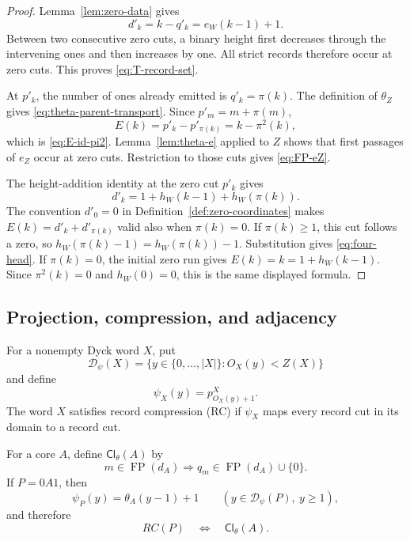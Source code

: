 \documentclass[11pt]{article}
\theoremstyle{definition}
\theoremstyle{remark}
\DeclareMathOperator{\FP}{FP}
\begin{document}
\begin{proof}
Lemma~\ref{lem:zero-data} gives
\[
 d'_k=k-q'_k=e_W(k-1)+1.
\]
Between two consecutive zero cuts, a binary height first decreases through
the intervening ones and then increases by one.  All strict records therefore
occur at zero cuts.  This proves \eqref{eq:T-record-set}.

At \(p'_k\), the number of ones already emitted is \(q'_k=\pi(k)\).  The
definition of \(\theta_Z\) gives \eqref{eq:theta-parent-transport}.  Since
\(p'_m=m+\pi(m)\),
\[
 E(k)=p'_k-p'_{\pi(k)}=k-\pi^2(k),
\]
which is \eqref{eq:E-id-pi2}.  Lemma~\ref{lem:theta-e} applied to \(Z\)
shows that first passages of \(e_Z\) occur at zero cuts.  Restriction to those
cuts gives \eqref{eq:FP-eZ}.

The height-addition identity at the zero cut \(p'_k\) gives
\[
 d'_k=1+h_W(k-1)+h_W(\pi(k)).
\]
The convention \(d'_0=0\) in
Definition~\ref{def:zero-coordinates} makes
\(E(k)=d'_k+d'_{\pi(k)}\) valid also when \(\pi(k)=0\).  If
\(\pi(k)\geq1\), this cut follows a zero,
so \(h_W(\pi(k)-1)=h_W(\pi(k))-1\).  Substitution gives
\eqref{eq:four-head}.  If \(\pi(k)=0\), the initial zero run gives
\(E(k)=k=1+h_W(k-1)\).  Since \(\pi^2(k)=0\) and \(h_W(0)=0\), this is the
same displayed formula.
\end{proof}

\subsection{Projection, compression, and adjacency}

For a nonempty Dyck word \(X\), put
\[
 \mathcal D_\psi(X)=\{y\in\{0,\ldots,|X|\}:O_X(y)<Z(X)\}
\]
and define
\begin{equation}
\label{eq:compression-map}
 \psi_X(y)=p^X_{O_X(y)+1}.
\end{equation}
The word \(X\) satisfies record compression (RC) if \(\psi_X\) maps every record cut in its domain
to a record cut.

For a core \(A\), define \(\mathsf{Cl}_\theta(A)\) by
\begin{equation}
\label{eq:theta-closure}
 m\in\FP(d_A)\Longrightarrow q_m\in\FP(d_A)\cup\{0\}.
\end{equation}
If \(P=0A1\), then
\begin{equation}
\label{eq:phi-theta-shift}
 \psi_P(y)=\theta_A(y-1)+1
 \qquad(y\in\mathcal D_\psi(P),\ y\geq1),
\end{equation}
and therefore
\begin{equation}
\label{eq:RC-Cl-equivalence}
 RC(P)\quad\Longleftrightarrow\quad\mathsf{Cl}_\theta(A).
\end{equation}
\end{document}
